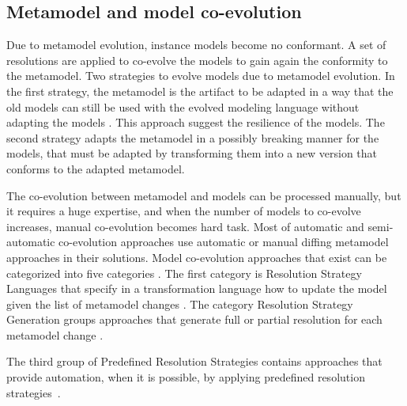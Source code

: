 \subsection{Metamodel and model co-evolution}
Due to metamodel evolution, instance models become no conformant. A set of resolutions are applied to co-evolve the models to gain again the conformity to the metamodel.
Two strategies to evolve models due to metamodel evolution. 
In the first strategy, the metamodel is the artifact to be adapted in a way that the old models can still be used with the evolved modeling language without adapting the models \cite{herrmannsdoerfer2009cope}. This approach suggest the resilience of the models. The second strategy adapts the metamodel in a possibly breaking manner for the models, that must be adapted by transforming them into a new version that conforms to the adapted metamodel.

 The co-evolution between metamodel and models can be processed manually, but it requires a huge expertise, and when the number of models to co-evolve increases, manual co-evolution becomes hard task. 
 Most of automatic and semi-automatic co-evolution approaches use automatic or manual diffing metamodel approaches in their solutions. Model co-evolution approaches that exist can be categorized into five categories \cite{Hebig2017}. The first category is Resolution Strategy Languages that specify in a transformation language how to update the model given the list of metamodel changes \cite{10.1007/978-3-540-87875-9_44,sprinkle2004domain,wimmer2010using,10.1007/978-3-642-30476-7_13,10.1007/978-3-642-38883-5_10,10.1007/s10270-012-0313-5,10.1007/s10270-012-0296-2}. The category Resolution Strategy Generation groups approaches that generate full or partial resolution for each metamodel change \cite{del2007semi,de2008generating,garces2009managing,meyers2011generic,anguel2014using}.
 
 
 The third group of Predefined Resolution Strategies contains approaches that provide automation, when it is possible, by applying predefined resolution strategies \cite{hossler2005coevolution,florez2012coevolution,fernandez2013adapting,wachsmuth2007metamodel,cicchetti2009managing,van2011generic,becker2007process,herrmannsdoerfer2009operation,wittern2013determining}. 
 
